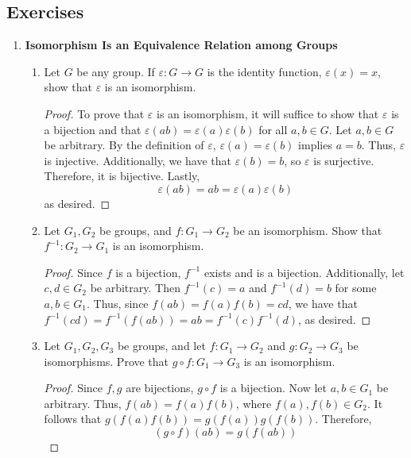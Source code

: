 \documentclass[../notes.tex]{subfiles}
\begin{document}
\subsection*{Exercises}
\begin{enumerate}[label={\textbf{\Alph*.}}]
    \item \textbf{Isomorphism Is an Equivalence Relation among Groups}
    \begin{enumerate}
        \item Let $G$ be any group. If $\varepsilon:G\to G$ is the identity function, $\varepsilon(x)=x$, show that $\varepsilon$ is an isomorphism.
        \begin{proof}
            To prove that $\varepsilon$ is an isomorphism, it will suffice to show that $\varepsilon$ is a bijection and that $\varepsilon(ab)=\varepsilon(a)\varepsilon(b)$ for all $a,b\in G$. Let $a,b\in G$ be arbitrary. By the definition of $\varepsilon$, $\varepsilon(a)=\varepsilon(b)$ implies $a=b$. Thus, $\varepsilon$ is injective. Additionally, we have that $\varepsilon(b)=b$, so $\varepsilon$ is surjective. Therefore, it is bijective. Lastly,
            \begin{equation*}
                \varepsilon(ab) = ab = \varepsilon(a)\varepsilon(b)
            \end{equation*}
            as desired.
        \end{proof}
        \item Let $G_1,G_2$ be groups, and $f:G_1\to G_2$ be an isomorphism. Show that $f^{-1}:G_2\to G_1$ is an isomorphism.
        \begin{proof}
            Since $f$ is a bijection, $f^{-1}$ exists and is a bijection. Additionally, let $c,d\in G_2$ be arbitrary. Then $f^{-1}(c)=a$ and $f^{-1}(d)=b$ for some $a,b\in G_1$. Thus, since $f(ab)=f(a)f(b)=cd$, we have that $f^{-1}(cd)=f^{-1}(f(ab))=ab=f^{-1}(c)f^{-1}(d)$, as desired.
        \end{proof}
        \item Let $G_1,G_2,G_3$ be groups, and let $f:G_1\to G_2$ and $g:G_2\to G_3$ be isomorphisms. Prove that $g\circ f:G_1\to G_3$ is an isomorphism.
        \begin{proof}
            Since $f,g$ are bijections, $g\circ f$ is a bijection. Now let $a,b\in G_1$ be arbitrary. Thus, $f(ab)=f(a)f(b)$, where $f(a),f(b)\in G_2$. It follows that $g(f(a)f(b))=g(f(a))g(f(b))$. Therefore,
            \begin{equation*}
                (g\circ f)(ab) = g(f(ab))

\end{equation*}
\end{proof}
\end{enumerate}
\end{enumerate}
\end{document}
